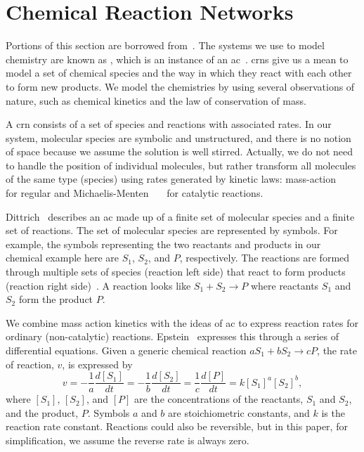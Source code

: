 \section{Chemical Reaction Networks}
Portions of this section are borrowed from~\cite{Moles2014-ia}. The systems we use to model chemistry are known as , which is an instance of an \acrfull{ac}~\cite{Dittrich2001-rn}. \Glspl{crn} give us a mean to model a set of chemical species and the way in which they react with each other to form new products. We model the chemistries by using several observations of nature, such as chemical kinetics and the law of conservation of mass. 

A \gls{crn} consists of a set of species and reactions with associated rates. In our system, molecular species are symbolic and unstructured, and there is no notion of space because we assume the solution is well stirred. Actually, we do not need to handle the position of individual molecules, but rather transform all molecules of the same type (species) using rates generated by kinetic laws: mass-action~\cite{Horn1972-ob}~\cite{Erdi1989-ll} for regular and Michaelis-Menten~\cite{Henri1903-jf}~\cite{Michaelis1913-zv}~\cite{Leskovac2003-ei} for catalytic reactions.

Dittrich~\cite{Dittrich2001-rn} describes an \gls{ac} made up of a finite set of molecular species and a finite set of reactions. The set of molecular species are represented by symbols. For example, the symbols representing the two reactants and products in our chemical example here are $S_1$, $S_2$, and $P$, respectively. The reactions are formed through multiple sets of species (reaction left side) that react to form products (reaction right side)~\cite{Banda2013-zs}. A reaction looks like $S_1 + S_2 \rightarrow P$ where reactants $S_1$ and $S_2$ form the product $P$.

We combine mass action kinetics with the ideas of \gls{ac} to express reaction rates for ordinary (non-catalytic) reactions. Epstein~\cite{Epstein1998-qw} expresses this through a series of differential equations. Given a generic chemical reaction $aS_1 + bS_2 \rightarrow cP$, the rate of reaction, $v$, is expressed by
\begin{equation}
v = -\frac{1}{a}\frac{d[S_1]}{dt} = -\frac{1}{b}\frac{d[S_2]}{dt} = \frac{1}{c}\frac{d[P]}{dt} = k[S_1]^a[S_2]^b,
\end{equation}
where $[S_1]$, $[S_2]$, and $[P]$ are the concentrations of the reactants, $S_1$ and $S_2$, and the product, $P$. Symbols $a$ and $b$ are stoichiometric constants, and $k$ is the reaction rate constant. Reactions could also be reversible, but in this paper, for simplification, we assume the reverse rate is always zero.

